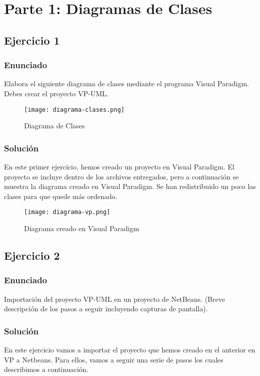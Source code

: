 \section{Parte 1: Diagramas de Clases}

\subsection{Ejercicio 1}

\subsubsection{Enunciado}
Elabora el siguiente diagrama de clases mediante el programa Visual Paradigm. Debes crear el proyecto VP-UML.

\begin{figure}[H]
    \centering
    \texttt{[image: diagrama-clases.png]}
    \caption{Diagrama de Clases}
\end{figure}

\subsubsection{Solución}
En este primer ejercicio, hemos creado un proyecto en Visual Paradigm. El proyecto se incluye dentro de los archivos entregados, pero a continuación se muestra la diagrama creado en Visual Paradigm. Se han  redistribuido un poco las clases para que quede más ordenado.

\begin{figure}[H]
    \centering
    \texttt{[image: diagrama-vp.png]}
    \caption{Diagrama creado en Visual Paradigm}
\end{figure}

\subsection{Ejercicio 2}

\subsubsection{Enunciado}
Importación del proyecto VP-UML en un proyecto de NetBeans. (Breve descripción de los pasos a seguir incluyendo capturas de pantalla).

\subsubsection{Solución}
En este ejercicio vamos a importar el proyecto que hemos creado en el anterior en VP a Netbeans. Para ellos, vamos a seguir una serie de pasos los cuales describimos a continuación.

